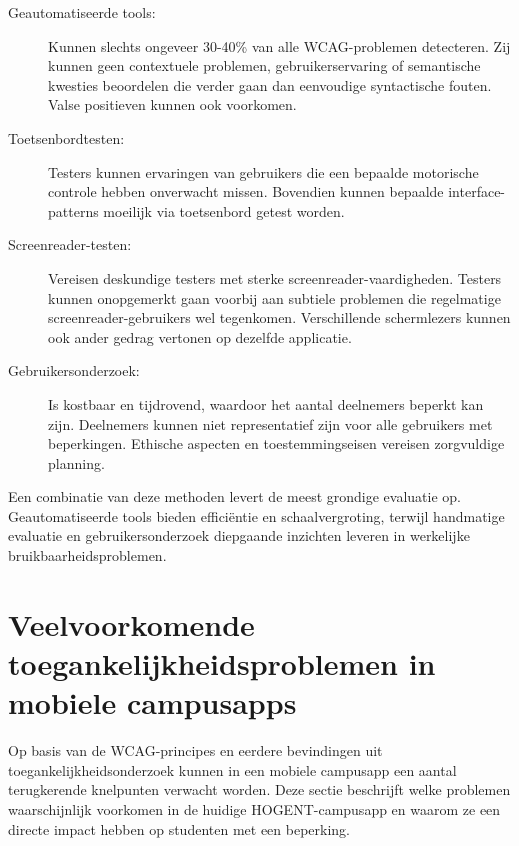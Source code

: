 \begin{description}
    \item[Geautomatiseerde tools:] Kunnen slechts ongeveer 30-40\% van alle WCAG-problemen detecteren. Zij kunnen geen contextuele problemen, gebruikerservaring of semantische kwesties beoordelen die verder gaan dan eenvoudige syntactische fouten. Valse positieven kunnen ook voorkomen. \autocite{Teran2021}
    
    \item[Toetsenbordtesten:] Testers kunnen ervaringen van gebruikers die een bepaalde motorische controle hebben onverwacht missen. Bovendien kunnen bepaalde interface-patterns moeilijk via toetsenbord getest worden.
    
    \item[Screenreader-testen:] Vereisen deskundige testers met sterke screenreader-vaardigheden. Testers kunnen onopgemerkt gaan voorbij aan subtiele problemen die regelmatige screenreader-gebruikers wel tegenkomen. Verschillende schermlezers kunnen ook ander gedrag vertonen op dezelfde applicatie.
    
    \item[Gebruikersonderzoek:] Is kostbaar en tijdrovend, waardoor het aantal deelnemers beperkt kan zijn. Deelnemers kunnen niet representatief zijn voor alle gebruikers met beperkingen. Ethische aspecten en toestemmingseisen vereisen zorgvuldige planning.
\end{description}

Een combinatie van deze methoden levert de meest grondige evaluatie op. Geautomatiseerde tools bieden efficiëntie en schaalvergroting, terwijl handmatige evaluatie en gebruikersonderzoek diepgaande inzichten leveren in werkelijke bruikbaarheidsproblemen.



\section{Veelvoorkomende toegankelijkheidsproblemen in mobiele campusapps}
\label{sec:veelvoorkomende-problemen}

Op basis van de WCAG-principes en eerdere bevindingen uit toegankelijkheidsonderzoek kunnen in een mobiele campusapp een aantal terugkerende knelpunten verwacht worden. Deze sectie beschrijft welke problemen waarschijnlijk voorkomen in de huidige HOGENT-campusapp en waarom ze een directe impact hebben op studenten met een beperking.

